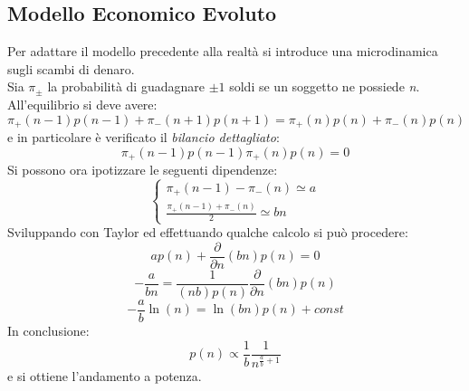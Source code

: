\documentclass[12pt, a4paper]{article}
\theoremstyle{theorem}
\begin{document}
		\subsection{Modello Economico Evoluto}
			Per adattare il modello precedente alla realtà si introduce una microdinamica sugli scambi di denaro.\\
			Sia $\pi_\pm$ la probabilità di guadagnare $\pm 1$ soldi se un soggetto ne possiede \textit{n}. All'equilibrio si deve avere:
			\begin{equation}
				\pi_+(n-1)p(n-1)+\pi_-(n+1)p(n+1)=\pi_+(n)p(n)+\pi_-(n)p(n)
			\end{equation}
			e in particolare è verificato il \textit{bilancio dettagliato}:
			\begin{equation}
				\pi_+(n-1)p(n-1)\pi_+(n)p(n)=0
			\end{equation}
			Si possono ora ipotizzare le seguenti dipendenze:
			\begin{equation}
				\begin{cases}
					\pi_+(n-1)-\pi_-(n)\simeq a\\
					\frac{\pi_+(n-1)+\pi_-(n)}{2}\simeq bn
				\end{cases}
			\end{equation}
			Sviluppando con Taylor ed effettuando qualche calcolo si può procedere:
			\begin{equation}
				ap(n)+\frac{\partial}{\partial n}(bn)p(n)=0
			\end{equation}
			\begin{equation}
				-\frac{a}{bn}=\frac{1}{(nb)p(n)}\frac{\partial}{\partial n}(bn)p(n)
			\end{equation}
			\begin{equation}
				-\frac{a}{b}\ln(n)=\ln(bn)p(n) + const
			\end{equation}
			In conclusione:
			\begin{equation}
				p(n)\propto\frac{1}{b}\frac{1}{n^{\frac{a}{b}+1}}
			\end{equation}
			e si ottiene l'andamento a potenza.
\end{document}
